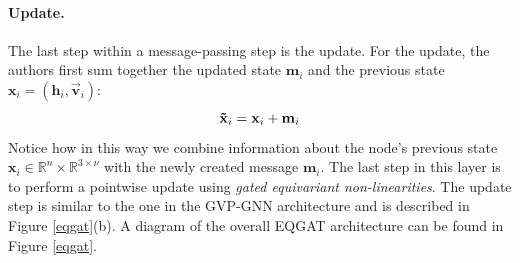 \paragraph{Update.} The last step within a message-passing step is the update. For the update, the authors first sum together the updated state $\mathbf{m}_i$ and the previous state $\mathbf{x}_i = (\mathbf{h}_i, \vec{\mathbf{v}}_i)$:
\begin{equation}
    \mathbf{\Tilde{x}}_i = \mathbf{x}_i + \mathbf{m}_i
\end{equation}
Notice how in this way we combine information about the node's previous state $\mathbf{x}_i\in\mathbb{R}^n\times\mathbb{R}^{3\times\nu}$ with the newly created message $\mathbf{m}_i$. The last step in this layer is to perform a pointwise update using \textit{gated equivariant non-linearities}. The update step is similar to the one in the GVP-GNN architecture and is described in Figure \ref{eqgat}(b). A diagram of the overall EQGAT architecture can be found in Figure \ref{eqgat}. 


